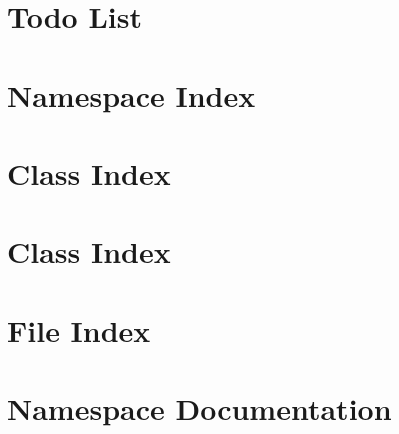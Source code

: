 \documentclass[a4paper]{article}
\begin{document}
\section{Todo List}
\label{todo}
\hypertarget{todo}{}

\section{Namespace Index}

\section{Class Index}

\section{Class Index}

\section{File Index}

\section{Namespace Documentation}





\end{document}
